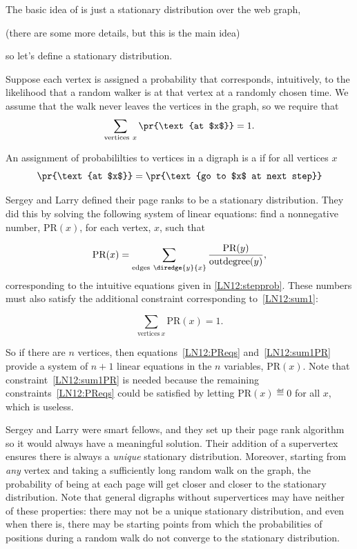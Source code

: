 The basic idea of  is just a stationary distribution over
the web graph,
\begin{editingnotes}
(there are some more details, but this is the main idea)
\end{editingnotes}
so let's define a stationary distribution.

Suppose each vertex is assigned a probability that corresponds, intuitively,
to the likelihood that a random walker is at that vertex at a randomly
chosen time.  We assume that the walk never leaves the vertices in the graph,
so we require that
\begin{equation}\label{LN12:sum1}
\sum_{\text{vertices}\ x} \pr{\text{at $x$}} = 1.
\end{equation}

\begin{definition} An assignment of probabililties to vertices in a digraph
  is a  if for all vertices $x$
\[
\pr{\text{at $x$}} = \pr{\text{go to $x$ at next step}}
\]
\end{definition}  

Sergey and Larry defined their page ranks to be a stationary distribution.
They did this by solving the following system of linear equations: find a
nonnegative number, $\text{PR}(x)$, for each vertex, $x$, such that

\begin{equation}\label{LN12:PReqs}
\text{PR}(x) = \sum_{\text{edges}\ \diredge{y}{x}} \frac{\text{PR}(y)}{\text{outdegree}(y)},
\end{equation}
corresponding to the intuitive equations given in \eqref{LN12:stepprob}.
These numbers must also satisfy the additional constraint corresponding
to~\eqref{LN12:sum1}:

\begin{equation}\label{LN12:sum1PR}
\sum_{\text{vertices}\ x} \text{PR}(x) = 1.
\end{equation}

So if there are $n$ vertices, then equations~\eqref{LN12:PReqs}
and~\eqref{LN12:sum1PR} provide a system of $n+1$ linear equations in the
$n$ variables, $\text{PR}(x)$.  Note that constraint~\eqref{LN12:sum1PR}
is needed because the remaining constraints~\eqref{LN12:PReqs} could be
satisfied by letting $\text{PR}(x)\eqdef 0$ for all $x$, which is useless.

Sergey and Larry were smart fellows, and they set up their page rank
algorithm so it would always have a meaningful solution.  Their addition
of a supervertex ensures there is always a \emph{unique} stationary
distribution.  Moreover, starting from \emph{any} vertex and taking a
sufficiently long random walk on the graph, the probability of being at
each page will get closer and closer to the stationary distribution.  Note
that general digraphs without supervertices may have neither of these
properties: there may not be a unique stationary distribution, and even
when there is, there may be starting points from which the probabilities
of positions during a random walk do not converge to the stationary
distribution.  

